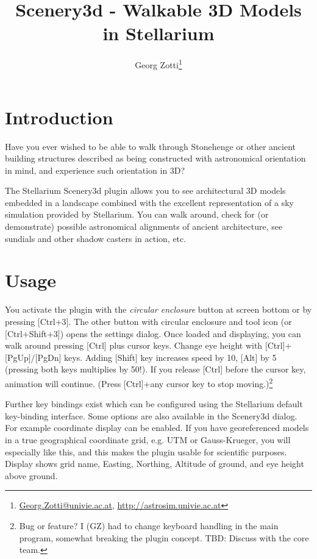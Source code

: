 \documentclass[a4paper]{article}
\title{Scenery3d - Walkable 3D Models in Stellarium}
\author{Georg Zotti\thanks{\url{Georg.Zotti@univie.ac.at}, \url{http://astrosim.univie.ac.at}}}
\begin{document}
\maketitle

\section{Introduction}
\label{sec:Introduction}


Have you ever wished to be able to walk through Stonehenge or other
ancient building structures described as being constructed with astronomical
orientation in mind, and experience such orientation in 3D?

The Stellarium Scenery3d plugin
allows you to see architectural 3D models
embedded in a landscape combined with the excellent representation of
a sky simulation provided by Stellarium. You can walk around, check
for (or demonstrate) possible astronomical alignments of ancient
architecture, see sundials and other shadow casters in action, etc.

\section{Usage}
\label{sec:Usage}


You activate the plugin with the \emph{circular enclosure} button at screen
bottom or by pressing [Ctrl+3]. The other button with circular
enclosure and tool icon (or [Ctrl+Shift+3]) opens the settings
dialog. Once loaded and displaying, you can walk around pressing
[Ctrl] plus cursor keys. Change eye height with [Ctrl]+[PgUp]/[PgDn]
keys. Adding [Shift] key increases speed by 10, [Alt] by 5 (pressing
both keys multiplies by 50!). If you release [Ctrl] before the cursor
key, animation will continue. (Press [Ctrl]+any cursor key to stop
moving.)\footnote{Bug or feature? I (GZ) had to change keyboard
  handling in the main program, somewhat breaking the plugin
  concept. TBD: Discuss with the core team.}

Further key bindings exist which can be configured using the Stellarium
default key-binding interface. Some options are also available in the
Scenery3d dialog. For example coordinate display can be enabled. If you have georeferenced models
in a true geographical coordinate grid, e.g. UTM or Gauss-Krueger, you
will especially like this, and this makes the plugin usable for
scientific purposes. Display shows grid name, Easting, Northing,
Altitude of ground, and eye height above ground.
\end{document}
